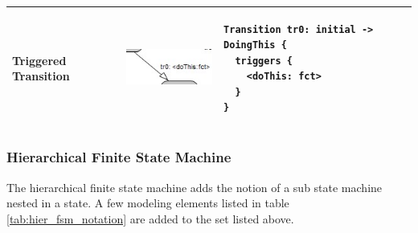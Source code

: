 \begin{table}
\begin{tabular}{|m{3cm}|c|m{7cm}|}
\\
\hline
 Triggered Transition & \includegraphics[scale=0.7]{images/040-TriggeredTransition.jpg} & 
\begin{lstlisting}
Transition tr0: initial -> DoingThis {
  triggers {
    <doThis: fct>
  }
}
\end{lstlisting}
\\
\hline
\end{tabular}
\end{table}


\subsubsection{Hierarchical Finite State Machine}

The hierarchical finite state machine adds the notion of a sub state machine nested in a state.
A few modeling elements listed in table \ref{tab:hier_fsm_notation} are added to the set listed above.

